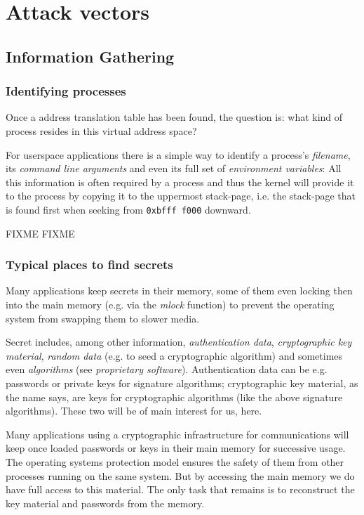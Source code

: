 %
%

\section{Attack vectors}




\subsection{Information Gathering}

\subsubsection{Identifying processes}

Once a address translation table has been found, the question is: what kind of
process resides in this virtual address space?

For userspace applications there is a simple way to identify a process's
\emph{filename}, its \emph{command line arguments} and even its full set of
\emph{environment variables}: All this information is often required by a
process and thus the kernel will provide it to the process by copying it to the
uppermost stack-page, i.e.  the stack-page that is found first when seeking from
\texttt{0xbfff~f000} downward.

FIXME FIXME

\subsubsection{Typical places to find secrets}

Many applications keep secrets in their memory, some of them even locking then
into the main memory (e.g. via the \emph{mlock} function) to prevent the
operating system from swapping them to slower media.

Secret includes, among other information, \emph{authentication data},
\emph{cryptographic key material}, \emph{random data} (e.g. to seed a
cryptographic algorithm) and sometimes even \emph{algorithms} (see
\emph{proprietary software}).  Authentication data can be e.g. passwords or
private keys for signature algorithms; cryptographic key material, as the name
says, are keys for cryptographic algorithms (like the above signature
algorithms). These two will be of main interest for us, here.

Many applications using a cryptographic infrastructure for communications will
keep once loaded passwords or keys in their main memory for successive usage.
The operating systems protection model ensures the safety of them from other
processes running on the same system. But by accessing the main memory we do
have full access to this material. The only task that remains is to reconstruct
the key material and passwords from the memory.

